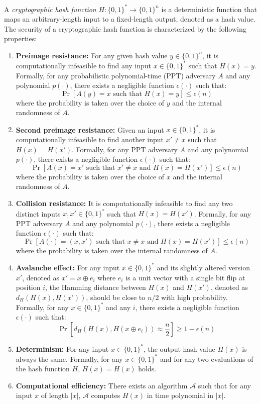 \documentclass{iacrtrans}
\begin{document}
\begin{definition}
	A \textit{cryptographic hash function} $H: \{0, 1\}^* \to \{0, 1\}^n$ is a deterministic function that maps an arbitrary-length input to a fixed-length output, denoted as a hash value. The security of a cryptographic hash function is characterized by the following properties:
	\begin{enumerate}
		\item \textbf{Preimage resistance:} For any given hash value $y \in \{0, 1\}^n$, it is computationally infeasible to find any input $x \in \{0, 1\}^*$ such that $H(x) = y$. Formally, for any probabilistic polynomial-time (PPT) adversary $A$ and any polynomial $p(\cdot)$, there exists a negligible function $\epsilon(\cdot)$ such that:
		      \[
		      	\Pr[A(y) = x \text{ such that } H(x) = y] \leq \epsilon(n)
		      \]
		      where the probability is taken over the choice of $y$ and the internal randomness of $A$.
		\item \textbf{Second preimage resistance:} Given an input $x \in \{0, 1\}^*$, it is computationally infeasible to find another input $x' \neq x$ such that $H(x) = H(x')$. Formally, for any PPT adversary $A$ and any polynomial $p(\cdot)$, there exists a negligible function $\epsilon(\cdot)$ such that:
		      \[
		      	\Pr[A(x) = x' \text{ such that } x' \neq x \text{ and } H(x) = H(x')] \leq \epsilon(n)
		      \]
		      where the probability is taken over the choice of $x$ and the internal randomness of $A$.
		\item \textbf{Collision resistance:} It is computationally infeasible to find any two distinct inputs $x, x' \in \{0, 1\}^*$ such that $H(x) = H(x')$. Formally, for any PPT adversary $A$ and any polynomial $p(\cdot)$, there exists a negligible function $\epsilon(\cdot)$ such that:
		      \[
		      	\Pr[A(\cdot) = (x, x') \text{ such that } x \neq x \text{ and } H(x) = H(x')] \leq \epsilon(n)
		      \]
		      where the probability is taken over the internal randomness of $A$.
		\item \textbf{Avalanche effect:} For any input $x \in \{0, 1\}^*$ and its slightly altered version $x'$, denoted as $x' = x \oplus e_i$ where $e_i$ is a unit vector with a single bit flip at position $i$, the Hamming distance between $H(x)$ and $H(x')$, denoted as $d_H(H(x), H(x'))$, should be close to $n/2$ with high probability. Formally, for any $x \in \{0, 1\}^*$ and any $i$, there exists a negligible function $\epsilon(\cdot)$ such that:
		      \[
		      	\Pr\left[d_H(H(x), H(x \oplus e_i)) \approx \frac{n}{2}\right] \geq 1 - \epsilon(n)
		      \]
		\item \textbf{Determinism:} For any input $x \in \{0, 1\}^*$, the output hash value $H(x)$ is always the same. Formally, for any $x \in \{0, 1\}^*$ and for any two evaluations of the hash function $H$, $H(x) = H(x)$ holds.
		\item \textbf{Computational efficiency:} There exists an algorithm $\mathcal{A}$ such that for any input $x$ of length $|x|$, $\mathcal{A}$ computes $H(x)$ in time polynomial in $|x|$.
	\end{enumerate}
\end{definition}
\end{document}
